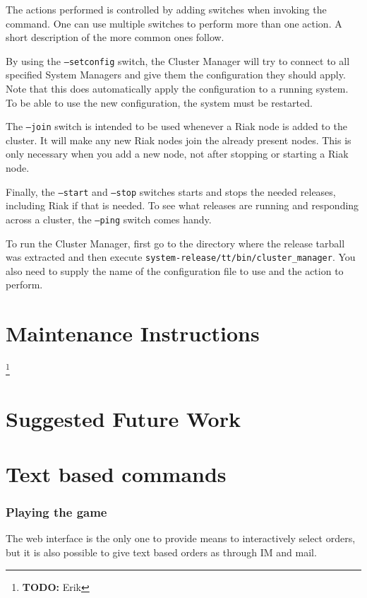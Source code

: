 \documentclass[11pt,a4paper]{report}
\newcommand{\todo}[1]{\footnote{{\color{red} {\bf TODO:} #1}}}
\begin{document}
The actions performed is controlled by adding switches when invoking the
command. One can use multiple switches to perform more than one action. A short
description of the more common ones follow.

By using the {\tt --setconfig} switch, the Cluster Manager will try to connect
to all specified System Managers and give them the configuration they should
apply. Note that this does automatically apply the configuration to a running
system. To be able to use the new configuration, the system must be restarted.

The {\tt --join} switch is intended to be used whenever a Riak node is added to
the cluster. It will make any new Riak nodes join the already present
nodes. This is only necessary when you add a new node, not after stopping or
starting a Riak node.

Finally, the {\tt --start} and {\tt --stop} switches starts and stops the needed
releases, including Riak if that is needed. To see what releases are running and
responding across a cluster, the {\tt--ping} switch comes handy.

\begin{sloppypar}
To run the Cluster Manager, first go to the directory where the release tarball
was extracted and then execute {\tt system-release/tt/bin/cluster\_manager}. You
also need to supply the name of the configuration file to use and the action to
perform.
\end{sloppypar}
\chapter{Maintenance Instructions}
\todo{Erik}

\chapter{Suggested Future Work}

\chapter{Text based commands}
\label{sec:textbasedcommands}

\subsection{Playing the game}
The web interface is the only one to provide means to interactively select
orders, but it is also possible to give text based orders as through IM and
mail.\\
\end{document}
